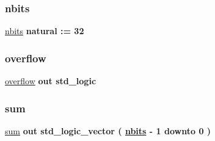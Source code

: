 \subsubsection{\texorpdfstring{nbits}{nbits}}
{\footnotesize\ttfamily \hyperlink{group___adder_gae1435c07d0cd54b521535e2f8de6f94e}{nbits} {\bfseries \textcolor{vhdlchar}{ }} {\bfseries \textcolor{vhdlchar}{natural}\textcolor{vhdlchar}{ }\textcolor{vhdlchar}{ }\textcolor{vhdlchar}{\+:}\textcolor{vhdlchar}{=}\textcolor{vhdlchar}{ }\textcolor{vhdlchar}{ } \textcolor{vhdldigit}{32} \textcolor{vhdlchar}{ }} \hspace{0.3cm}{\ttfamily [Generic]}}

\mbox{\label{group___adder_ga9650307dde287e0bcfa1e26370c006c2}} 
\subsubsection{\texorpdfstring{overflow}{overflow}}
{\footnotesize\ttfamily \hyperlink{group___adder_ga9650307dde287e0bcfa1e26370c006c2}{overflow} {\bfseries \textcolor{vhdlchar}{out}\textcolor{vhdlchar}{ }} {\bfseries \textcolor{vhdlchar}{std\+\_\+logic}\textcolor{vhdlchar}{ }} \hspace{0.3cm}{\ttfamily [Port]}}

\mbox{\label{group___adder_ga01f6ea3ddb4d1519676217bcb5959de8}} 
\subsubsection{\texorpdfstring{sum}{sum}}
{\footnotesize\ttfamily \hyperlink{group___adder_ga01f6ea3ddb4d1519676217bcb5959de8}{sum} {\bfseries \textcolor{vhdlchar}{out}\textcolor{vhdlchar}{ }} {\bfseries \textcolor{vhdlchar}{std\+\_\+logic\+\_\+vector}\textcolor{vhdlchar}{ }\textcolor{vhdlchar}{(}\textcolor{vhdlchar}{ }\textcolor{vhdlchar}{ }\textcolor{vhdlchar}{ }\textcolor{vhdlchar}{ }{\bfseries \hyperlink{group___adder_gae1435c07d0cd54b521535e2f8de6f94e}{nbits}} \textcolor{vhdlchar}{-\/}\textcolor{vhdlchar}{ } \textcolor{vhdldigit}{1} \textcolor{vhdlchar}{ }\textcolor{vhdlchar}{downto}\textcolor{vhdlchar}{ }\textcolor{vhdlchar}{ } \textcolor{vhdldigit}{0} \textcolor{vhdlchar}{ }\textcolor{vhdlchar}{)}\textcolor{vhdlchar}{ }} \hspace{0.3cm}{\ttfamily [Port]}}



